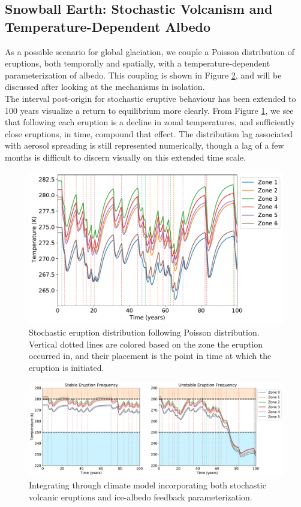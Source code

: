 \documentclass[12pt]{article}
\begin{document}
\subsection{Snowball Earth: Stochastic Volcanism and Temperature-Dependent
Albedo} 
As a possible scenario for global glaciation, we couple a Poisson
distribution of eruptions, both temporally and spatially, with a
temperature-dependent parameterization of albedo. This coupling is shown in
Figure \ref{fig:fireandice}, and will be discussed after looking at the
mechanisms in isolation. \\

The interval post-origin for stochastic eruptive behaviour has been extended to
100 years visualize a return to equilibrium more clearly. From Figure
\ref{fig:stocherupt}, we see that following each eruption is a decline in zonal
temperatures, and sufficiently close eruptions, in time, compound that effect.
The distribution lag associated with aerosol spreading is still represented
numerically, though a lag of a few months is difficult to discern visually on
this extended time scale. 

\begin{figure}[H]
    \centering
    \includegraphics[scale=0.6]{stochastic_eruptions.pdf}
    \caption{
        Stochastic eruption distribution following Poisson distribution.
        Vertical dotted lines are colored based on the zone the eruption
        occurred in, and their placement is the point in time at which the
        eruption is initiated.
    }
    \label{fig:stocherupt}
\end{figure}
\FloatBarrier

\begin{figure}[H]
    \centering
    \includegraphics[width=\linewidth]{eruptions_albedo.pdf}
    \caption{
        Integrating through climate model incorporating both stochastic volcanic
        eruptions and ice-albedo feedback parameterization.
    }
    \label{fig:fireandice}
\end{figure}
\FloatBarrier
\end{document}
